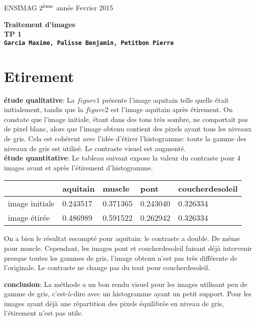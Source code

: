 \documentclass[12pt]{article}
\newcommand{\noi}{\noindent}
\numberwithin{equation}{section}
\begin{document}
\baselineskip7mm

\noi ENSIMAG $2^{\footnotesize \mbox{ème}}$ année   \hfill Fevrier 2015


\vspace{1cm}


\begin{center}
{\Large \bf Traitement d'images\\ TP 1 \\ \texttt{Garcia Maxime, Palisse Benjamin, Petitbon Pierre}}
\end{center}

\vspace{5mm}


\section{Etirement}

\textbf{étude qualitative}: La $figure 1$ présente l'image aquitain telle quelle était initialement, tandis que la $figure 2$ est l'image aquitain après étirement. On constate que l'image initiale, étant dans des tons très sombre, ne comportait pas de pixel blanc, alors que l'image obtenu contient des pixels ayant tous les niveaux de gris. Cela est cohérent avec l'idée d'étirer l'histogramme: toute la gamme des niveaux de gris est utilisé. Le contraste visuel est augmenté.\\

\textbf{étude quantitative}: Le tableau suivant expose la valeur du contraste pour $4$ images avant et après l'étirement d'histogramme.\\
\begin{tabular}{|l|l|l|l|l|}
\hline
 & aquitain & muscle & pont & coucherdesoleil\\
\hline
image initiale & 0.243517 & 0.371365 & 0.243040 & 0.326334\\
\hline
image étirée & 0.486989 & 0.591522 & 0.262942 & 0.326334 \\
\hline
\end{tabular}

On a bien le résultat escompté pour aquitain: le contraste a double. De même pour muscle. Cependant, les images pont et coucherdesoleil faisant déjà intervenir presque toutes les gammes de gris, l'image obtenu n'est pas très différente de l'originale. Le contraste ne change pas du tout pour coucherdesoleil.

\textbf{conclusion}: La méthode a un bon rendu visuel pour les images utilisant peu de gamme de gris, c'est-à-dire avec un histogramme ayant un petit support. Pour les images ayant déjà une répartition des pixels équilibrée en niveau de gris, l'étirement n'est pas utile.
\end{document}
